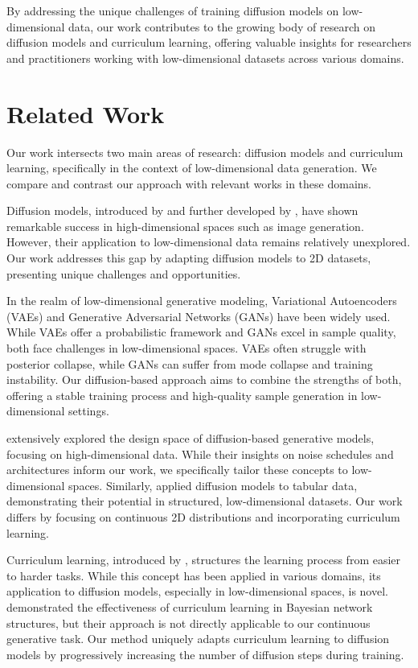 \documentclass{article} %
\begin{document}
By addressing the unique challenges of training diffusion models on low-dimensional data, our work contributes to the growing body of research on diffusion models \cite{ddpm, edm} and curriculum learning, offering valuable insights for researchers and practitioners working with low-dimensional datasets across various domains.

\section{Related Work}
\label{sec:related}

Our work intersects two main areas of research: diffusion models and curriculum learning, specifically in the context of low-dimensional data generation. We compare and contrast our approach with relevant works in these domains.

Diffusion models, introduced by \citet{pmlr-v37-sohl-dickstein15} and further developed by \citet{ddpm}, have shown remarkable success in high-dimensional spaces such as image generation. However, their application to low-dimensional data remains relatively unexplored. Our work addresses this gap by adapting diffusion models to 2D datasets, presenting unique challenges and opportunities.

In the realm of low-dimensional generative modeling, Variational Autoencoders (VAEs) \citep{vae} and Generative Adversarial Networks (GANs) \citep{gan} have been widely used. While VAEs offer a probabilistic framework and GANs excel in sample quality, both face challenges in low-dimensional spaces. VAEs often struggle with posterior collapse, while GANs can suffer from mode collapse and training instability. Our diffusion-based approach aims to combine the strengths of both, offering a stable training process and high-quality sample generation in low-dimensional settings.

\citet{Karras2022ElucidatingTD} extensively explored the design space of diffusion-based generative models, focusing on high-dimensional data. While their insights on noise schedules and architectures inform our work, we specifically tailor these concepts to low-dimensional spaces. Similarly, \citet{kotelnikov2022tabddpm} applied diffusion models to tabular data, demonstrating their potential in structured, low-dimensional datasets. Our work differs by focusing on continuous 2D distributions and incorporating curriculum learning.

Curriculum learning, introduced by \citet{bengio2009curriculum}, structures the learning process from easier to harder tasks. While this concept has been applied in various domains, its application to diffusion models, especially in low-dimensional spaces, is novel. \citet{Zhao2015CurriculumLO} demonstrated the effectiveness of curriculum learning in Bayesian network structures, but their approach is not directly applicable to our continuous generative task. Our method uniquely adapts curriculum learning to diffusion models by progressively increasing the number of diffusion steps during training.
\end{document}
